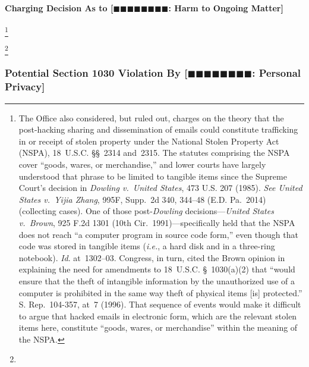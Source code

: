 \paragraph{Charging Decision As to [$\blacksquare\blacksquare\blacksquare\blacksquare\blacksquare\blacksquare\blacksquare\blacksquare$: Harm to Ongoing Matter]}
\footnote{The Office also considered, but ruled out, charges on the theory that the post-hacking sharing and dissemination of emails could constitute trafficking in or receipt of stolen property under the National Stolen Property Act (NSPA), 18~U.S.C. \S\S~2314 and~2315.
The statutes comprising the NSPA cover ``goods, wares, or merchandise,'' and lower courts have largely understood that phrase to be limited to tangible items since the Supreme Court's decision in \textit{Dowling v.\ United States}, 473 U.S. 207 (1985).
\textit{See United States v.\ Yijia Zhang}, 995F, Supp.~2d 340, 344--48 (E.D. Pa.~2014) (collecting cases).
One of those post-\textit{Dowling} decisions---\textit{United States v.\ Brown}, 925 F.2d 1301 (10th Cir.~1991)---specifically held that the NSPA does not reach ``a computer program in source code form,'' even though that code was stored in tangible items (\textit{i.e.}, a hard disk and in a three-ring notebook).
\textit{Id}. at~1302--03.
Congress, in turn, cited the Brown opinion in explaining the need for amendments to 18~U.S.C. \S~1030(a)(2) that ``would ensure that the theft of intangible information by the unauthorized use of a computer is prohibited in the same way theft of physical items [is] protected.''
S. Rep.~104-357, at~7 (1996).
That sequence of events would make it difficult to argue that hacked emails in electronic form, which are the relevant stolen items here, constitute ``goods, wares, or merchandise'' within the meaning of the NSPA.}




\footnote{}






\subsubsection{Potential Section 1030 Violation By [$\blacksquare\blacksquare\blacksquare\blacksquare\blacksquare\blacksquare\blacksquare\blacksquare$: Personal Privacy]}

